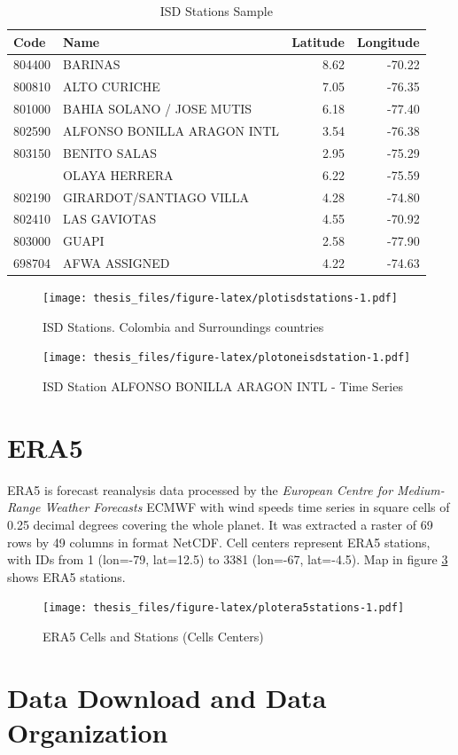 \documentclass[12pt,twoside]{reedthesis}
\begin{document}
\begingroup\fontsize{10}{12}\selectfont
\begin{longtable}[t]{llrr}
\caption[ISD Stations Sample]{\label{tab:tableisdstations}ISD Stations Sample}\\
\toprule
Code & Name & Latitude & Longitude\\
\midrule
804400 & BARINAS & 8.62 & -70.22\\
800810 & ALTO CURICHE & 7.05 & -76.35\\
801000 & BAHIA SOLANO / JOSE MUTIS & 6.18 & -77.40\\
802590 & ALFONSO BONILLA ARAGON INTL & 3.54 & -76.38\\
803150 & BENITO SALAS & 2.95 & -75.29\\
\addlinespace
801100 & OLAYA HERRERA & 6.22 & -75.59\\
802190 & GIRARDOT/SANTIAGO VILLA & 4.28 & -74.80\\
802410 & LAS GAVIOTAS & 4.55 & -70.92\\
803000 & GUAPI & 2.58 & -77.90\\
698704 & AFWA ASSIGNED & 4.22 & -74.63\\
\bottomrule
\end{longtable}
\endgroup{}
\begin{figure}
\centering
\texttt{[image: thesis\_files/figure-latex/plotisdstations-1.pdf]}
\caption{\label{fig:plotisdstations}ISD Stations. Colombia and Surroundings countries}
\end{figure}
\begin{figure}
\centering
\texttt{[image: thesis\_files/figure-latex/plotoneisdstation-1.pdf]}
\caption{\label{fig:plotoneisdstation}ISD Station ALFONSO BONILLA ARAGON INTL - Time Series}
\end{figure}
\hypertarget{era5}{%
\section{ERA5}\label{era5}}

ERA5 is forecast reanalysis data processed by the \emph{European Centre for Medium-Range Weather Forecasts} ECMWF with wind speeds time series in square cells of 0.25 decimal degrees covering the whole planet. It was extracted a raster of 69 rows by 49 columns in format NetCDF. Cell centers represent ERA5 stations, with IDs from 1 (lon=-79, lat=12.5) to 3381 (lon=-67, lat=-4.5). Map in figure \ref{fig:plotera5stations} shows ERA5 stations.
\begin{figure}
\centering
\texttt{[image: thesis\_files/figure-latex/plotera5stations-1.pdf]}
\caption{\label{fig:plotera5stations}ERA5 Cells and Stations (Cells Centers)}
\end{figure}
\hypertarget{data-download-and-data-organization}{%
\section{Data Download and Data Organization}\label{data-download-and-data-organization}}
\end{document}
